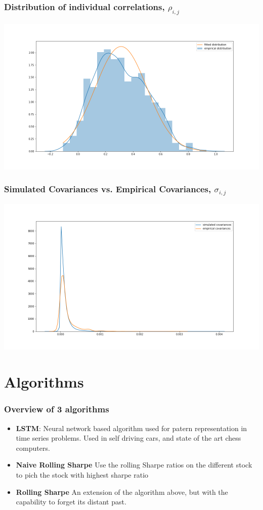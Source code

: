 \documentclass{beamer}
\begin{document}
\begin{frame}
\frametitle{Distribution of individual correlations, $\rho_{i,j}$}

\centering
\includegraphics[scale=0.32]{../figures/correlation_distribution.png}

\end{frame}

\begin{frame}
\frametitle{Simulated Covariances vs. Empirical Covariances, $\sigma_{i,j}$}

\centering
\includegraphics[scale=0.32]{../figures/dist_simulated_covariances.png}

\end{frame}

\section{Algorithms}

\begin{frame}
\frametitle{Overview of 3 algorithms}
\begin{itemize}
    \item \textbf{LSTM}: Neural network based algorithm used for patern representation in time series problems. Used in self driving cars, and state of the art chess computers.
    \item \textbf{Naive Rolling Sharpe} Use the rolling Sharpe ratios on the different stock to pich the stock with highest sharpe ratio
    \item \textbf{Rolling Sharpe} An extension of the algorithm above, but with the capability to forget its distant past.
\end{itemize}
\end{frame}
\end{document}
